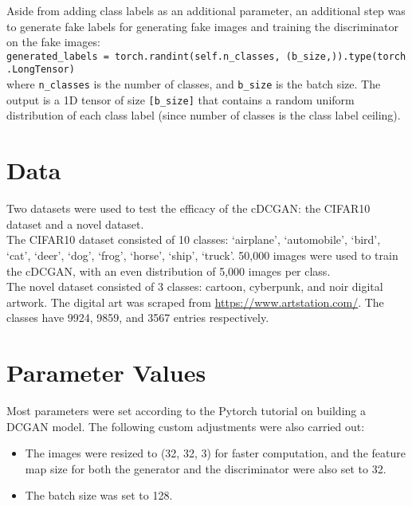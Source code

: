 \documentclass[11pt]{article}
\begin{document}
Aside from adding class labels as an additional parameter, an additional
step was to generate fake labels for generating fake images and training
the discriminator on the fake images:\\

\texttt{generated\_labels\ =\ torch.randint(self.n\_classes,\ (b\_size,)).type(torch.LongTensor)}\\

where \texttt{n\_classes} is the number of classes, and \texttt{b\_size}
is the batch size. The output is a 1D tensor of size
\texttt{{[}b\_size{]}} that contains a random uniform distribution of
each class label (since number of classes is the class label ceiling).

\newpage
\section{Data}\label{data}

Two datasets were used to test the efficacy of the cDCGAN: the CIFAR10
dataset and a novel dataset.\\

The CIFAR10 dataset consisted of 10 classes: `airplane', `automobile',
`bird', `cat', `deer', `dog', `frog', `horse', `ship', `truck'. 50,000
images were used to train the cDCGAN, with an even distribution of 5,000
images per class.\\

The novel dataset consisted of 3 classes: cartoon, cyberpunk, and noir
digital artwork. The digital art was scraped from
\url{https://www.artstation.com/}. The classes have 9924, 9859, and 3567
entries respectively.

\section{Parameter Values}\label{parameter-values}

Most parameters were set according to the Pytorch tutorial on building a
DCGAN model. The following custom adjustments were also carried out:

\begin{itemize}
\item
  The images were resized to (32, 32, 3) for faster computation, and the
  feature map size for both the generator and the discriminator were
  also set to 32.
\item
  The batch size was set to 128.
\end{itemize}
\end{document}
